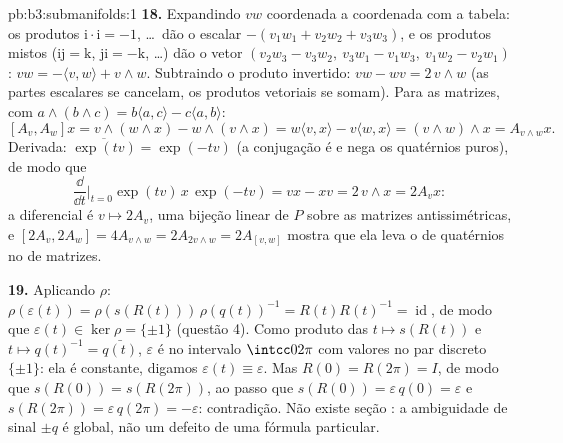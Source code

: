 \begin{solution}{pb:b3:submanifolds:1}
\textbf{18.} Expandindo $vw$ coordenada a coordenada com a tabela:
os produtos $\mathrm i\cdot\mathrm i = -1$, \dots\ dão
o escalar $-(v_1w_1 + v_2w_2 + v_3w_3)$, e os produtos
mistos ($\mathrm{ij} = \mathrm k$, $\mathrm{ji} =
-\mathrm k$, \dots) dão o vetor $(v_2w_3 - v_3w_2,\
v_3w_1 - v_1w_3,\ v_1w_2 - v_2w_1)$: $vw = -\langle v,
w\rangle + v\wedge w$. Subtraindo o produto invertido:
$vw - wv = 2\,v\wedge w$ (as partes escalares se cancelam, os
produtos vetoriais se somam). Para as matrizes, com $a\wedge(b\wedge
c) = b\langle a, c\rangle - c\langle a, b\rangle$:
\[
[A_v, A_w]x = v\wedge(w\wedge x) - w\wedge(v\wedge x)
= w\langle v, x\rangle - v\langle w, x\rangle
= (v\wedge w)\wedge x = A_{v\wedge w}x .
\]
Derivada: $\overline{\exp(tv)} = \exp(-tv)$ (a conjugação
é  e nega os quatérnios puros), de modo que
\[
\frac{\dd}{\dd t}\Bigr|_{t=0}\exp(tv)\,x\,\exp(-tv) = vx -
xv = 2\,v\wedge x = 2A_vx :
\]
a diferencial é $v \mapsto 2A_v$, uma bijeção linear
de $P$ sobre as matrizes antissimétricas, e $[2A_v, 2A_w]
= 4A_{v\wedge w} = 2A_{2v\wedge w} = 2A_{[v,w]}$ mostra que ela
leva o  de quatérnios no  de
matrizes.

\textbf{19.} Aplicando $\rho$: $\rho(\varepsilon(t)) =
\rho(s(R(t)))\,\rho(q(t))^{-1} = R(t)R(t)^{-1} =
\operatorname{id}$, de modo que $\varepsilon(t) \in \ker\rho =
\{\pm1\}$ (questão 4). Como produto das 
$t \mapsto s(R(t))$ e $t \mapsto q(t)^{-1} =
\bar{q(t)}$, $\varepsilon$ é  no 
intervalo $\intcc0{2\pi}$ com valores no par discreto
$\{\pm1\}$: ela é constante, digamos $\varepsilon(t) \equiv
\varepsilon$. Mas $R(0) = R(2\pi) = I$, de modo que $s(R(0)) =
s(R(2\pi))$, ao passo que $s(R(0)) = \varepsilon\,q(0) =
\varepsilon$ e $s(R(2\pi)) = \varepsilon\,q(2\pi) =
-\varepsilon$: contradição. Não existe seção :
a ambiguidade de sinal $\pm q$ é global, não um defeito
de uma fórmula particular.


\end{solution}
